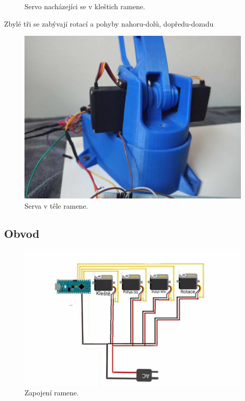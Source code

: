 \documentclass[12pt, a4paper,
twoside,        %
openright
]{report}
\begin{document}
{\begin{figure}[h]
	\caption{Servo nacházejíci se v kleštich ramene\cite{servo-kleste}.} %
	\label{fig:Servo-kleste} %
\end{figure}

	Zbylé tři se zabývají rotací a pohyby nahoru-dolů, dopředu-dozadu

\begin{figure}[h]
	
	\centering
	\includegraphics[width=0.5\linewidth]{image/serva.jpg} 
	
	\caption{Serva v těle ramene.} %
	\label{fig:Serva} %
\end{figure}

\newpage

\subsection{Obvod}

\begin{figure}[h]
	
	\centering
	\includegraphics[width=0.9\linewidth]{image/obvod.jpg} 
	
	
	\caption{Zapojení ramene.} %
	\label{fig:obvod} %
\end{figure}

}
\end{document}
